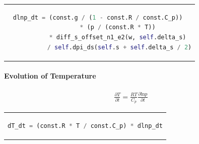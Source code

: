\begin{center}
\begin{tabular}{c}
\begin{lstlisting}[language=Python]
dlnp_dt = (const.g / (1 - const.R / const.C_p)) 
           * (p / (const.R * T)) 
           * diff_s_offset_n1_e2(w, self.delta_s) 
           / self.dpi_ds(self.s + self.delta_s / 2)
\end{lstlisting}
\end{tabular}
\end{center}

\paragraph{Evolution of Temperature}
\begin{align*}
\frac{\partial T}{\partial t} = \frac{RT}{C_p}\frac{\partial \text{ln}p}{\partial t}
\end{align*}

\begin{center}
\begin{tabular}{c}
\begin{lstlisting}[language=Python]
dT_dt = (const.R * T / const.C_p) * dlnp_dt
\end{lstlisting}
\end{tabular}
\end{center}

